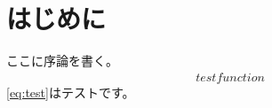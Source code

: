 \section{はじめに}
ここに序論を書く。
\begin{align}
test function
\label{eq:test}
\end{align}
\eqref{eq:test}はテストです。

\pagebreak